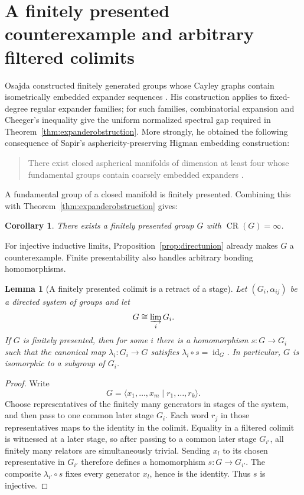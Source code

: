 \documentclass[11pt]{article}
\newtheorem{lemma}[theorem]{Lemma}
\newtheorem{corollary}[theorem]{Corollary}
\newcommand{\CR}{\operatorname{CR}}
\newcommand{\directlim}{\varinjlim}
\begin{document}
\section{A finitely presented counterexample and arbitrary filtered colimits}

Osajda constructed finitely generated groups whose Cayley graphs contain isometrically embedded expander sequences \cite[Theorem~3.2 and Corollary~3.3]{Osajda2020}.  His construction applies to fixed-degree regular expander families; for such families, combinatorial expansion and Cheeger's inequality give the uniform normalized spectral gap required in Theorem~\ref{thm:expanderobstruction}.  More strongly, he obtained the following consequence of Sapir's asphericity-preserving Higman embedding construction:
\begin{quote}
There exist closed aspherical manifolds of dimension at least four whose fundamental groups contain coarsely embedded expanders \cite[Corollary~3.5]{Osajda2020}.
\end{quote}
A fundamental group of a closed manifold is finitely presented.  Combining this with Theorem~\ref{thm:expanderobstruction} gives:

\begin{corollary}\label{cor:fpbad}
There exists a finitely presented group $G$ with $\CR(G)=\infty$.
\end{corollary}

For injective inductive limits, Proposition~\ref{prop:directunion} already makes $G$ a counterexample.  Finite presentability also handles arbitrary bonding homomorphisms.

\begin{lemma}[A finitely presented colimit is a retract of a stage]\label{lem:retract}
Let $(G_i,\alpha_{ij})$ be a directed system of groups and let
\[
  G\cong\directlim_i G_i.
\]
If $G$ is finitely presented, then for some $i$ there is a homomorphism
$s:G\to G_i$ such that the canonical map $\lambda_i:G_i\to G$ satisfies
$\lambda_i\circ s=\operatorname{id}_G$.  In particular, $G$ is isomorphic to a subgroup of $G_i$.
\end{lemma}

\begin{proof}
Write
\[
  G=\langle x_1,\ldots,x_m\mid r_1,\ldots,r_k\rangle.
\]
Choose representatives of the finitely many generators in stages of the system, and then pass to one common later stage $G_i$.  Each word $r_j$ in those representatives maps to the identity in the colimit.  Equality in a filtered colimit is witnessed at a later stage, so after passing to a common later stage $G_{i'}$, all finitely many relators are simultaneously trivial.  Sending $x_l$ to its chosen representative in $G_{i'}$ therefore defines a homomorphism $s:G\to G_{i'}$.  The composite $\lambda_{i'}\circ s$ fixes every generator $x_l$, hence is the identity.  Thus $s$ is injective.
\end{proof}
\end{document}
